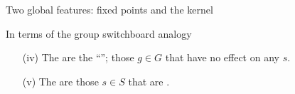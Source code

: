 \documentclass[8pt, handout]{beamer}
\newcommand{\Pause}{}      %
\begin{document}
\begin{frame}{Two global features: fixed points and the kernel}
  \Pause
  
  \begin{exampleblock}{In terms of the group switchboard analogy} \Pause
    \begin{enumerate}
    \item[(iv)] The  are the
      ``''; those $g\in G$ that have no
      effect on any $s$. \Pause
    \item[(v)] The  are those $s\in
      S$ that are .
    \end{enumerate}
  \end{exampleblock}
  
\end{frame}

\end{document}
